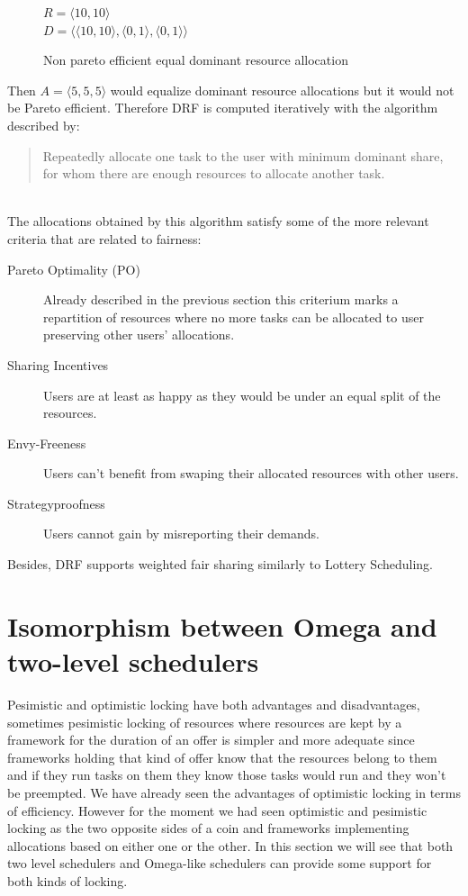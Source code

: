 \documentclass{svjour3}                     %
\begin{document}
\begin{figure}[!ht]
\centering
$R = \langle 10, 10 \rangle$ \\
$D = \langle \langle 10, 10 \rangle, \langle 0, 1 \rangle, \langle 0, 1 \rangle \rangle$ \\
\caption{Non pareto efficient equal dominant resource allocation}
\label{fig:nonpareto}
\end{figure}

Then $A = \langle 5, 5, 5 \rangle$ would equalize dominant resource
allocations but it would not be Pareto efficient. Therefore DRF is computed
iteratively with the algorithm described by: \\

\blockquote{Repeatedly allocate one task to the user with minimum dominant
share, for whom there are enough resources to allocate another task.} \\

The allocations obtained by this algorithm satisfy some of the more
relevant criteria that are related to fairness: \\

\begin{description}
  \item[Pareto Optimality (PO)] Already described in the previous
  section this criterium marks a repartition of resources where
  no more tasks can be allocated to user preserving other users'
  allocations.
  \item[Sharing Incentives]  Users are at least as happy as they
  would be under an equal split of the resources.
  \item[Envy-Freeness] Users can't benefit from swaping their
  allocated resources with other users.
  \item[Strategyproofness] Users cannot gain by misreporting
  their demands.
\end{description}

Besides, DRF supports weighted fair sharing similarly to Lottery
Scheduling. 

\section {Isomorphism between Omega and two-level schedulers}

Pesimistic and optimistic locking have both advantages and
disadvantages, sometimes pesimistic locking of resources where
resources are kept by a framework for the duration of an offer is
simpler and more adequate since frameworks holding that kind of offer
know that the resources belong to them and if they run tasks on them
they know those tasks would run and they won't be preempted. We have
already seen the advantages of optimistic locking in terms of
efficiency. However for the moment we had seen optimistic and
pesimistic locking as the two opposite sides of a coin and frameworks
implementing allocations based on either one or the other. In this
section we will see that both two level schedulers and Omega-like
schedulers can provide some support for both kinds of locking.
\end{document}
